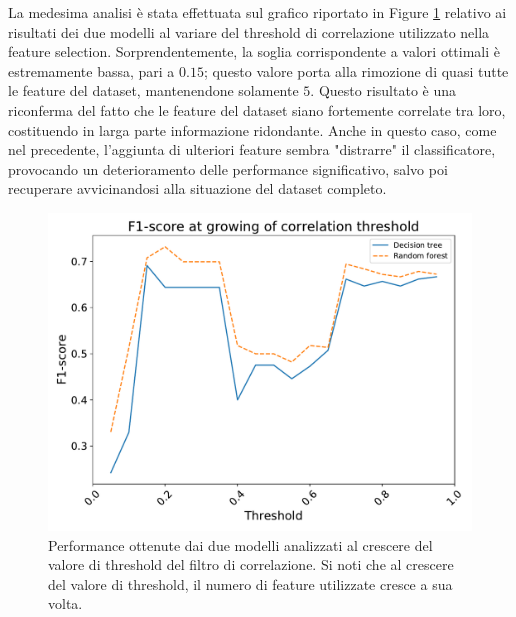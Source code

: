 La medesima analisi è stata effettuata sul grafico riportato in Figure \ref{fig:corr-perf} relativo ai risultati dei due modelli al variare del threshold di correlazione utilizzato nella feature selection.
Sorprendentemente, la soglia corrispondente a valori ottimali è estremamente bassa, pari a $0.15$; questo valore porta alla rimozione di quasi tutte le feature del dataset, mantenendone solamente $5$.
Questo risultato è una riconferma del fatto che le feature del dataset siano fortemente correlate tra loro, costituendo in larga parte informazione ridondante.
Anche in questo caso, come nel precedente, l'aggiunta di ulteriori feature sembra "distrarre" il classificatore, provocando un deterioramento delle performance significativo, salvo poi recuperare avvicinandosi alla situazione del dataset completo.
\begin{figure}
	\centering
	\includegraphics[width=1\linewidth]{images/corr-perf}
	\caption{Performance ottenute dai due modelli analizzati al crescere del valore di threshold del filtro di correlazione. Si noti che al crescere del valore di threshold, il numero di feature utilizzate cresce a sua volta.}
	\label{fig:corr-perf}
\end{figure}


